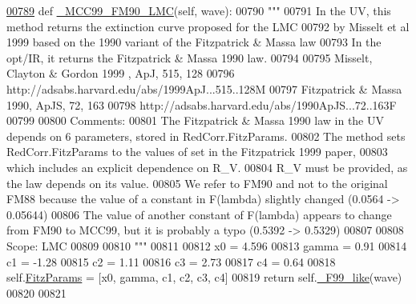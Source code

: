 \begin{DoxyVerb}
\begin{DoxyCode}
\hypertarget{classpyneb_1_1extinction_1_1red__corr_1_1_red_corr_l00789}{}\hyperlink{classpyneb_1_1extinction_1_1red__corr_1_1_red_corr_a9eacce21ff80a457fc1d285291eed996}{00789}     \textcolor{keyword}{def }\hyperlink{classpyneb_1_1extinction_1_1red__corr_1_1_red_corr_a9eacce21ff80a457fc1d285291eed996}{\_MCC99\_FM90\_LMC}(self, wave):
00790         \textcolor{stringliteral}{"""}
00791 \textcolor{stringliteral}{        In the UV, this method returns the extinction curve proposed for the LMC }
00792 \textcolor{stringliteral}{        by Misselt et al 1999 based on the 1990 variant of the Fitzpatrick & Massa law}
00793 \textcolor{stringliteral}{        In the opt/IR, it returns the Fitzpatrick & Massa 1990 law.}
00794 \textcolor{stringliteral}{}
00795 \textcolor{stringliteral}{        Misselt, Clayton & Gordon 1999 , ApJ, 515, 128 }
00796 \textcolor{stringliteral}{        http://adsabs.harvard.edu/abs/1999ApJ...515..128M}
00797 \textcolor{stringliteral}{        Fitzpatrick & Massa 1990, ApJS, 72, 163}
00798 \textcolor{stringliteral}{        http://adsabs.harvard.edu/abs/1990ApJS...72..163F}
00799 \textcolor{stringliteral}{        }
00800 \textcolor{stringliteral}{        Comments:}
00801 \textcolor{stringliteral}{        The Fitzpatrick & Massa 1990 law in the UV depends on 6 parameters, stored in RedCorr.FitzParams.}
00802 \textcolor{stringliteral}{        The method sets RedCorr.FitzParams to the values of set in the Fitzpatrick 1999 paper, }
00803 \textcolor{stringliteral}{        which includes an explicit dependence on R\_V.}
00804 \textcolor{stringliteral}{        R\_V must be provided, as the law depends on its value.}
00805 \textcolor{stringliteral}{        We refer to FM90 and not to the original FM88 because the value of a constant in F(lambda) slightly
       changed (0.0564 -> 0.05644)}
00806 \textcolor{stringliteral}{        The value of another constant of F(lambda) appears to change from FM90 to MCC99, but it is probably
       a typo (0.5392 -> 0.5329) }
00807 \textcolor{stringliteral}{        }
00808 \textcolor{stringliteral}{        Scope: LMC}
00809 \textcolor{stringliteral}{}
00810 \textcolor{stringliteral}{        """}
00811     
00812         x0 = 4.596  
00813         gamma = 0.91
00814         c1 = -1.28
00815         c2 = 1.11    
00816         c3 = 2.73    
00817         c4 = 0.64    
00818         self.\hyperlink{classpyneb_1_1extinction_1_1red__corr_1_1_red_corr_a133fcc7513d358e629266b24cbe7bebc}{FitzParams} = [x0, gamma, c1, c2, c3, c4]
00819         \textcolor{keywordflow}{return} self.\hyperlink{classpyneb_1_1extinction_1_1red__corr_1_1_red_corr_afa769aa42ed7d39fb04fd36fda88b54e}{\_F99\_like}(wave)
00820 
00821 
\end{DoxyCode}
\hypertarget{classpyneb_1_1extinction_1_1red__corr_1_1_red_corr_a758a99903861c8b015cc2074766ad811}{}

\end{DoxyVerb}
